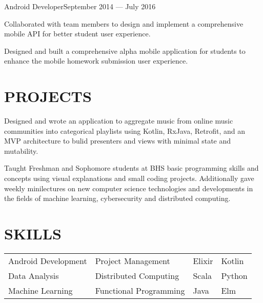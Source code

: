 \documentclass[10pt]{article}
\begin{document}
                  	 
                {Android Developer}{September 2014 --- July 2016}
                 			\begin{accomplishments}					        
                   			\item Collaborated with team members to design and implement a comprehensive mobile API for better student user experience.
                   			\item Designed and built a comprehensive alpha mobile application for students to enhance the mobile homework submission user experience.
                  		 \end{accomplishments}
                  		 
                  
\section*{PROJECTS}
                 {Designed and wrote an application to aggregate music from online music communities into categorical playlists using Kotlin, RxJava, Retrofit, and an MVP architecture to bulid presenters and views with minimal state and mutability.}
                
							{Taught Freshman and Sophomore students at BHS basic programming skills and concepts using visual explanations and small coding projects. Additionally gave weekly mini{\textendash}lectures on new computer science technologies and developments in the fields of machine learning, cybersecurity and distributed computing.}

\section*{SKILLS}
				\setlength{\columnsep}{1pt}
				\begin{tabu}{X[2c]X[2c]X[c]X[c]}
					Android Development  & Project Management & Elixir& Kotlin \\
					Data Analysis 			   & Distributed Computing & Scala & Python \\
					Machine Learning		   & Functional Programming & Java & Elm \\
				\end{tabu}
 
\end{document}
